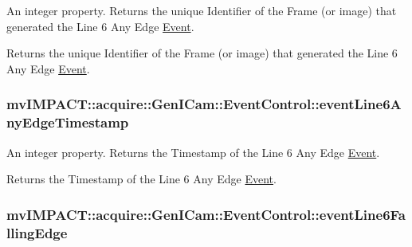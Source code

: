 An integer property. Returns the unique Identifier of the Frame (or image) that generated the Line 6 Any Edge \hyperlink{classmv_i_m_p_a_c_t_1_1acquire_1_1_event}{Event}. 

Returns the unique Identifier of the Frame (or image) that generated the Line 6 Any Edge \hyperlink{classmv_i_m_p_a_c_t_1_1acquire_1_1_event}{Event}. \hypertarget{classmv_i_m_p_a_c_t_1_1acquire_1_1_gen_i_cam_1_1_event_control_ad77d1afc284411afe65eba9c8cf8e9c8}{
\subsubsection[{event\+Line6\+Any\+Edge\+Timestamp}]{ mv\+I\+M\+P\+A\+C\+T\+::acquire\+::\+Gen\+I\+Cam\+::\+Event\+Control\+::event\+Line6\+Any\+Edge\+Timestamp}}\label{classmv_i_m_p_a_c_t_1_1acquire_1_1_gen_i_cam_1_1_event_control_ad77d1afc284411afe65eba9c8cf8e9c8}


An integer property. Returns the Timestamp of the Line 6 Any Edge \hyperlink{classmv_i_m_p_a_c_t_1_1acquire_1_1_event}{Event}. 

Returns the Timestamp of the Line 6 Any Edge \hyperlink{classmv_i_m_p_a_c_t_1_1acquire_1_1_event}{Event}. \hypertarget{classmv_i_m_p_a_c_t_1_1acquire_1_1_gen_i_cam_1_1_event_control_ac360617db478d7c03880786d026e3bcd}{
\subsubsection[{event\+Line6\+Falling\+Edge}]{ mv\+I\+M\+P\+A\+C\+T\+::acquire\+::\+Gen\+I\+Cam\+::\+Event\+Control\+::event\+Line6\+Falling\+Edge}}\label{classmv_i_m_p_a_c_t_1_1acquire_1_1_gen_i_cam_1_1_event_control_ac360617db478d7c03880786d026e3bcd}


